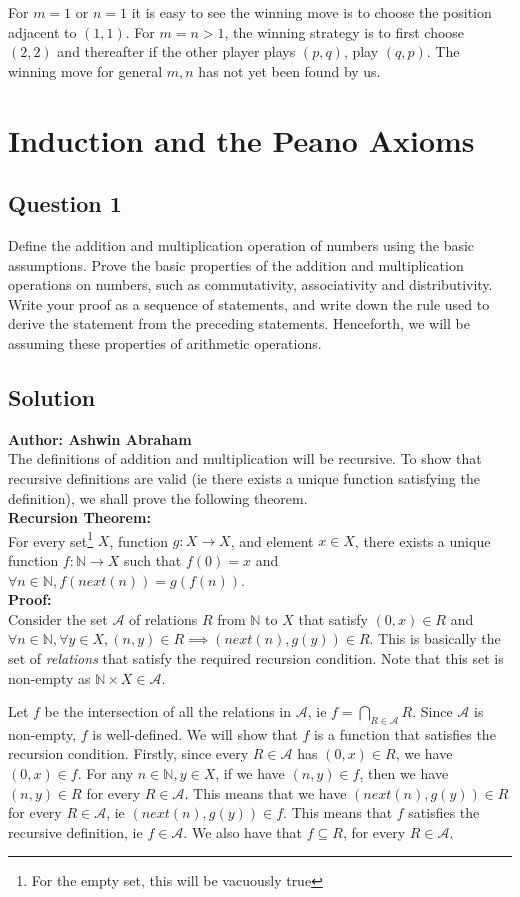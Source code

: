 \documentclass[12pt]{report}
\begin{document}
For $m = 1$ or $n = 1$ it is easy to see the winning move is to choose the position adjacent to $(1, 1)$. For $m = n > 1$, the winning strategy is to first choose $(2, 2)$ and thereafter if the other player plays $(p, q)$, play $(q, p)$. The winning move for general $m, n$ has not yet been found by us.
\chapter{Induction and the Peano Axioms}
\section*{Question 1}
Define the addition and multiplication operation of numbers using the basic assumptions. Prove the basic properties of the addition and multiplication operations on numbers, such as commutativity, associativity and distributivity.
Write your proof as a sequence of statements, and write down the rule used to derive the statement from the preceding statements. Henceforth, we will be assuming these properties of arithmetic operations.
\section*{Solution}
\textbf{Author: Ashwin Abraham}\\
The definitions of addition and multiplication will be recursive. To show that recursive definitions are valid (ie there exists a unique function satisfying the definition), we shall prove the following theorem.\\
\textbf{Recursion Theorem:}\\
For every set\footnote{For the empty set, this will be vacuously true} $X$, function $g: X \rightarrow X$, and element $x \in X$, there exists a unique function $f : \mathbb{N} \rightarrow X$ such that $f(0) = x$ and $\forall n \in \mathbb{N}, f(next(n)) = g(f(n))$.\\
\textbf{Proof:}\\
Consider the set $\mathcal{A}$ of relations $R$ from $\mathbb{N}$ to $X$ that satisfy $(0, x) \in R$ and\\ $\forall n \in \mathbb{N}, \forall y \in X, (n, y) \in R \implies (next(n), g(y)) \in R$. This is basically the set of \textit{relations} that satisfy the required recursion condition. Note that this set is non-empty as $\mathbb{N} \times X \in \mathcal{A}$. 

Let $f$ be the intersection of all the relations in $\mathcal{A}$, ie $f = \bigcap\limits_{R \in \mathcal{A}} R$. Since $\mathcal{A}$ is non-empty, $f$ is well-defined. We will show that $f$ is a function that satisfies the recursion condition. Firstly, since every $R \in \mathcal{A}$ has $(0, x) \in R$, we have $(0, x) \in f$. For any $n \in \mathbb{N}, y \in X$, if we have $(n, y) \in f$, then we have $(n, y) \in R$ for every $R \in \mathcal{A}$. This means that we have $(next(n), g(y)) \in R$ for every $R \in \mathcal{A}$, ie $(next(n), g(y)) \in f$. This means that $f$ satisfies the recursive definition, ie $f \in \mathcal{A}$. We also have that $f \subseteq R$, for every $R \in \mathcal{A}$. 
\end{document}
